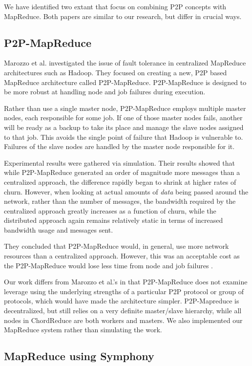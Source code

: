 \documentclass[conference, compsocconf, letterpaper]{IEEEtran}
\begin{document}
We have identified two extant that focus on combining P2P concepts with MapReduce.  Both papers are similar to our research, but differ in crucial ways.

\subsection{P2P-MapReduce}
Marozzo et al. \cite{marozzo2012p2p} investigated the issue of fault tolerance in centralized MapReduce architectures such as Hadoop.  They focused on creating a new, P2P based MapReduce architecture called P2P-MapReduce.  P2P-MapReduce is designed to be more robust at handling node and job failures during execution.

Rather than use a single master node, P2P-MapReduce employs multiple master nodes, each responsible for some job.  If one of those master nodes fails, another will be ready as a backup to take its place and manage the slave nodes assigned to that job.  This avoids the single point of failure that Hadoop is vulnerable to. Failures of the slave nodes are handled by the master node responsible for it.

Experimental results were gathered via simulation. Their results showed that while P2P-MapReduce generated an order of magnitude more messages than a centralized approach, the difference rapidly began to shrink at higher rates of churn.  However, when looking at actual amounts of \emph{data} being passed around the network, rather than the number of messages, the bandwidth required by the centralized approach greatly increases as a function of churn, while the distributed approach again remains relatively static in terms of increased bandwidth usage and messages sent.  

They concluded that P2P-MapReduce would, in general, use more network resources than a centralized approach. However, this was an acceptable cost as the P2P-MapReduce would lose less time from node and job failures \cite{marozzo2012p2p}.

Our work differs from Marozzo et al.'s in that P2P-MapReduce does not examine leverage using the underlying strengths of a particular P2P protocol or group of protocols, which would have made the architecture simpler.  P2P-Mapreduce is decentralized, but still relies on a very definite master/slave hierarchy, while all nodes in ChordReduce are both workers and masters.  We also implemented our MapReduce system rather than simulating the work.

\subsection{MapReduce using Symphony}
\end{document}

